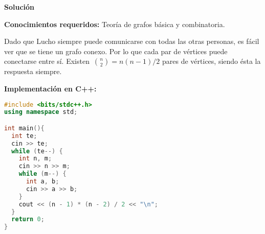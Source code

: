 \vspace*{0cm}
{\Large\textbf{Solución}}

\textbf{Conocimientos requeridos:} Teoría de grafos básica y combinatoria.

Dado que Lucho siempre puede comunicarse con todas las otras personas, es fácil ver
que se tiene un grafo conexo. Por lo que cada par de vértices puede conectarse entre
sí. Existen~${n \choose 2} = n(n - 1) / 2$ pares de vértices, siendo ésta la
respuesta siempre.

\textbf{Implementación en C++:}

\begin{lstlisting}[language=C++]
#include <bits/stdc++.h>
using namespace std;

int main(){
  int te;
  cin >> te;
  while (te--) {
    int n, m;
    cin >> n >> m;
    while (m--) {
      int a, b;
      cin >> a >> b;
    }
    cout << (n - 1) * (n - 2) / 2 << "\n";
  }
  return 0;
}
\end{lstlisting}

\newpage

